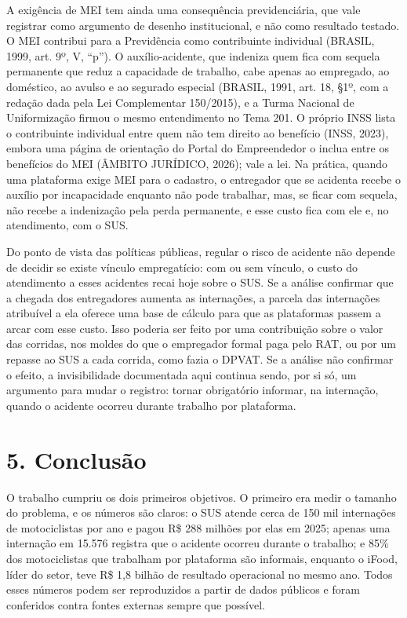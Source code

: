 \documentclass[
  11pt,
]{article}
\begin{document}
A exigência de MEI tem ainda uma consequência previdenciária, que vale registrar como argumento de desenho institucional, e não como resultado testado. O MEI contribui para a Previdência como contribuinte individual (BRASIL, 1999, art. 9º, V, ``p''). O auxílio-acidente, que indeniza quem fica com sequela permanente que reduz a capacidade de trabalho, cabe apenas ao empregado, ao doméstico, ao avulso e ao segurado especial (BRASIL, 1991, art. 18, §1º, com a redação dada pela Lei Complementar 150/2015), e a Turma Nacional de Uniformização firmou o mesmo entendimento no Tema 201. O próprio INSS lista o contribuinte individual entre quem não tem direito ao benefício (INSS, 2023), embora uma página de orientação do Portal do Empreendedor o inclua entre os benefícios do MEI (ÂMBITO JURÍDICO, 2026); vale a lei. Na prática, quando uma plataforma exige MEI para o cadastro, o entregador que se acidenta recebe o auxílio por incapacidade enquanto não pode trabalhar, mas, se ficar com sequela, não recebe a indenização pela perda permanente, e esse custo fica com ele e, no atendimento, com o SUS.

Do ponto de vista das políticas públicas, regular o risco de acidente não depende de decidir se existe vínculo empregatício: com ou sem vínculo, o custo do atendimento a esses acidentes recai hoje sobre o SUS. Se a análise confirmar que a chegada dos entregadores aumenta as internações, a parcela das internações atribuível a ela oferece uma base de cálculo para que as plataformas passem a arcar com esse custo. Isso poderia ser feito por uma contribuição sobre o valor das corridas, nos moldes do que o empregador formal paga pelo RAT, ou por um repasse ao SUS a cada corrida, como fazia o DPVAT. Se a análise não confirmar o efeito, a invisibilidade documentada aqui continua sendo, por si só, um argumento para mudar o registro: tornar obrigatório informar, na internação, quando o acidente ocorreu durante trabalho por plataforma.

\hypertarget{conclusuxe3o}{%
\section{5. Conclusão}\label{conclusuxe3o}}

O trabalho cumpriu os dois primeiros objetivos. O primeiro era medir o tamanho do problema, e os números são claros: o SUS atende cerca de 150 mil internações de motociclistas por ano e pagou R\$ 288 milhões por elas em 2025; apenas uma internação em 15.576 registra que o acidente ocorreu durante o trabalho; e 85\% dos motociclistas que trabalham por plataforma são informais, enquanto o iFood, líder do setor, teve R\$ 1,8 bilhão de resultado operacional no mesmo ano. Todos esses números podem ser reproduzidos a partir de dados públicos e foram conferidos contra fontes externas sempre que possível.
\end{document}
